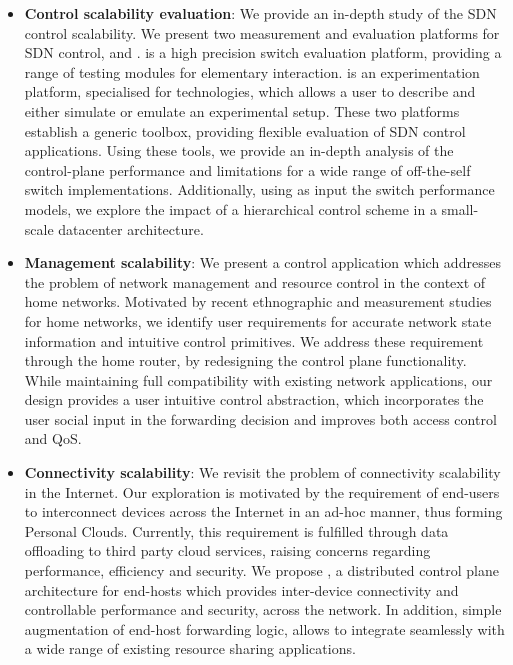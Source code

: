 \begin{itemize}
  \item \textbf{Control scalability evaluation}: We provide an in-depth study of 
    the SDN control scalability. We present two measurement and evaluation platforms for
    SDN control, \oflops and \sdnsim. \oflops is a high precision switch
    evaluation platform, providing a range of testing modules for elementary \of
    interaction. \sdnsim is an experimentation platform, specialised for
    \of technologies, which allows a user to describe and
    either simulate or emulate an experimental setup. These two platforms establish a
    generic toolbox, providing flexible evaluation of SDN control
    applications. Using these tools, we provide an in-depth
    analysis of the control-plane performance and limitations for a  
    wide range of off-the-self \of switch implementations. Additionally, using as
    input the \oflops switch performance models, we explore the impact of
    a hierarchical control  scheme in a small-scale datacenter architecture. 
 
  \item \textbf{Management scalability}: We present a control application which
    addresses the problem of network management and resource control in the
    context of home networks.  Motivated by recent ethnographic and measurement
    studies for home networks, we identify user requirements for accurate
    network state information and intuitive control primitives. We address these
    requirement through the home router, by redesigning the control plane
    functionality.  While maintaining full compatibility with existing network
    applications, our design provides a user intuitive control abstraction,
    which incorporates the user social input in the forwarding decision and
    improves both access control and  QoS.

  \item \textbf{Connectivity scalability}: We revisit the problem of
    connectivity scalability in the Internet.  Our exploration is motivated by
    the requirement of end-users to interconnect devices across the Internet in
    an ad-hoc manner, thus forming Personal Clouds. Currently, this requirement
    is fulfilled through data offloading to third party cloud services, raising
    concerns regarding performance, efficiency and security.  We propose
    \signpost, a distributed control plane architecture for end-hosts which
    provides inter-device connectivity and controllable performance and
    security, across the network. In addition, simple augmentation of end-host forwarding
    logic, allows \signpost to integrate seamlessly with a wide range of
    existing resource sharing applications.
\end{itemize}

